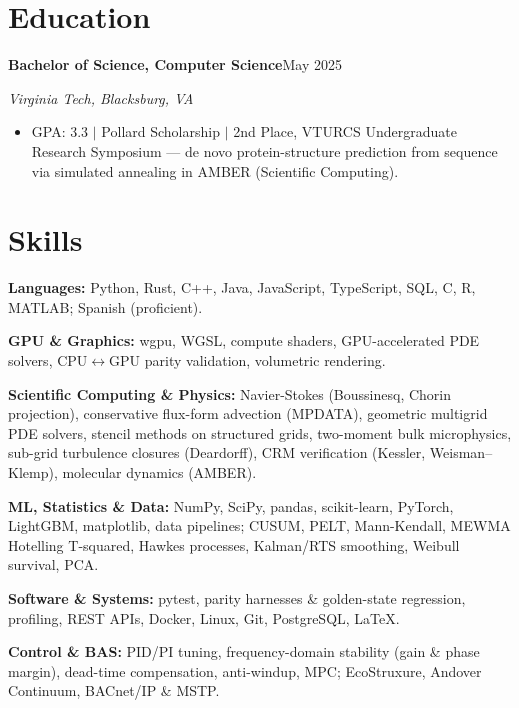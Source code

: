 \documentclass[letterpaper,9pt]{extarticle}
\newcommand{\entry}[2]{%
  \textbf{#1}\hfill#2\par}
\newcommand{\subentry}[2]{%
  \textit{#1}\hfill\textit{#2}\par\vspace{0.2ex}}
\begin{document}
\section{Education}

\entry{Bachelor of Science, Computer Science}{May 2025}
\subentry{Virginia Tech, Blacksburg, VA}{}
\begin{itemize}
  \item GPA: 3.3 $\vert$ Pollard Scholarship $\vert$ 2nd Place, VTURCS Undergraduate Research Symposium --- de novo protein-structure prediction from sequence via simulated annealing in AMBER (Scientific Computing).
\end{itemize}

\section{Skills}

\textbf{Languages:} Python, Rust, C++, Java, JavaScript, TypeScript, SQL, C, R, MATLAB; Spanish (proficient).\par\vspace{0.25ex}
\textbf{GPU \& Graphics:} wgpu, WGSL, compute shaders, GPU-accelerated PDE solvers, CPU$\leftrightarrow$GPU parity validation, volumetric rendering.\par\vspace{0.25ex}
\textbf{Scientific Computing \& Physics:} Navier-Stokes (Boussinesq, Chorin projection), conservative flux-form advection (MPDATA), geometric multigrid PDE solvers, stencil methods on structured grids, two-moment bulk microphysics, sub-grid turbulence closures (Deardorff), CRM verification (Kessler, Weisman--Klemp), molecular dynamics (AMBER).\par\vspace{0.25ex}
\textbf{ML, Statistics \& Data:} NumPy, SciPy, pandas, scikit-learn, PyTorch, LightGBM, matplotlib, data pipelines; CUSUM, PELT, Mann-Kendall, MEWMA Hotelling T-squared, Hawkes processes, Kalman/RTS smoothing, Weibull survival, PCA.\par\vspace{0.25ex}
\textbf{Software \& Systems:} pytest, parity harnesses \& golden-state regression, profiling, REST APIs, Docker, Linux, Git, PostgreSQL, LaTeX.\par\vspace{0.25ex}
\textbf{Control \& BAS:} PID/PI tuning, frequency-domain stability (gain \& phase margin), dead-time compensation, anti-windup, MPC; EcoStruxure, Andover Continuum, BACnet/IP \& MSTP.
\end{document}
